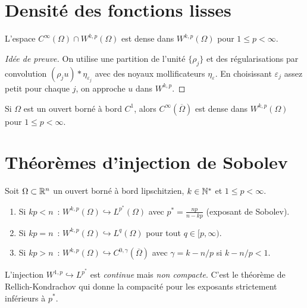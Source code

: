 \section{Densit\'e des fonctions lisses}

\begin{theoreme}
L'espace $C^\infty(\Omega) \cap W^{k,p}(\Omega)$ est dense dans $W^{k,p}(\Omega)$
pour $1 \leq p < \infty$.
\end{theoreme}

\begin{proof}[Id\'ee de preuve]
On utilise une partition de l'unit\'e $\{\rho_j\}$ et des r\'egularisations par
convolution $(\rho_j u) * \eta_{\varepsilon_j}$ avec des noyaux mollificateurs
$\eta_\varepsilon$. En choisissant $\varepsilon_j$ assez petit pour chaque $j$,
on approche $u$ dans $W^{k,p}$.
\end{proof}

\begin{theoreme}
Si $\Omega$ est un ouvert born\'e \`a bord $C^1$, alors $C^\infty(\overline{\Omega})$
est dense dans $W^{k,p}(\Omega)$ pour $1 \leq p < \infty$.
\end{theoreme}

\section{Th\'eor\`emes d'injection de Sobolev}

\begin{theoreme}
\label{thm:sobolev_injection}
Soit $\Omega \subset \mathbb{R}^n$ un ouvert born\'e \`a bord lipschitzien, $k \in \mathbb{N}^*$
et $1 \leq p < \infty$.
\begin{enumerate}
    \item Si $kp < n$~: $W^{k,p}(\Omega) \hookrightarrow L^{p^*}(\Omega)$
          avec $p^* = \frac{np}{n - kp}$ (exposant de Sobolev).
    \item Si $kp = n$~: $W^{k,p}(\Omega) \hookrightarrow L^q(\Omega)$
          pour tout $q \in [p, \infty)$.
    \item Si $kp > n$~: $W^{k,p}(\Omega) \hookrightarrow C^{0,\gamma}(\overline{\Omega})$
          avec $\gamma = k - n/p$ si $k - n/p < 1$.
\end{enumerate}
\end{theoreme}

\begin{attention}[title=\textbf{L'exposant critique}]
L'injection $W^{1,p} \hookrightarrow L^{p^*}$ est \emph{continue} mais
\emph{non compacte}. C'est le th\'eor\`eme de Rellich-Kondrachov qui donne
la compacit\'e pour les exposants strictement inf\'erieurs \`a $p^*$.
\end{attention}

